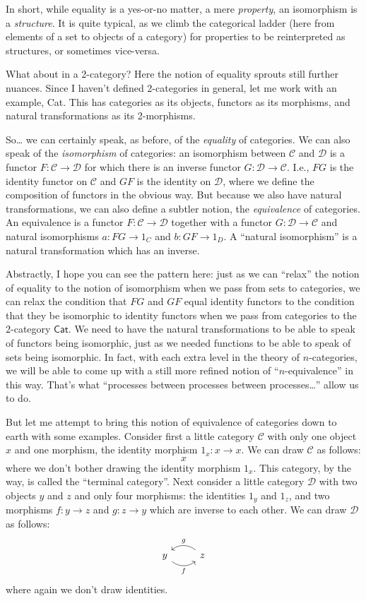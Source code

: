 \documentclass{article}
\begin{document}
In short, while equality is a yes-or-no matter, a mere \emph{property},
an isomorphism is a \emph{structure}. It is quite typical, as we climb
the categorical ladder (here from elements of a set to objects of a
category) for properties to be reinterpreted as structures, or sometimes
vice-versa.

What about in a 2-category? Here the notion of equality sprouts still
further nuances. Since I haven't defined 2-categories in general, let me
work with an example, Cat. This has categories as its objects, functors
as its morphisms, and natural transformations as its 2-morphisms.

So\ldots{} we can certainly speak, as before, of the \emph{equality} of
categories. We can also speak of the \emph{isomorphism} of categories:
an isomorphism between \(\mathcal{C}\) and \(\mathcal{D}\) is a functor
\(F\colon\mathcal{C}\to\mathcal{D}\) for which there is an inverse
functor \(G\colon\mathcal{D}\to\mathcal{C}\). I.e., \(FG\) is the
identity functor on \(\mathcal{C}\) and \(GF\) is the identity on
\(\mathcal{D}\), where we define the composition of functors in the
obvious way. But because we also have natural transformations, we can
also define a subtler notion, the \emph{equivalence} of categories. An
equivalence is a functor \(F\colon\mathcal{C}\to\mathcal{D}\) together
with a functor \(G\colon\mathcal{D}\to\mathcal{C}\) and natural
isomorphisms \(a\colon FG\to 1_C\) and \(b\colon GF \to 1_D\). A
``natural isomorphism'' is a natural transformation which has an
inverse.

Abstractly, I hope you can see the pattern here: just as we can
``relax'' the notion of equality to the notion of isomorphism when we
pass from sets to categories, we can relax the condition that \(FG\) and
\(GF\) equal identity functors to the condition that they be isomorphic
to identity functors when we pass from categories to the 2-category
\(\mathsf{Cat}\). We need to have the natural transformations to be able
to speak of functors being isomorphic, just as we needed functions to be
able to speak of sets being isomorphic. In fact, with each extra level
in the theory of \(n\)-categories, we will be able to come up with a
still more refined notion of ``\(n\)-equivalence'' in this way. That's
what ``processes between processes between processes\ldots{}'' allow us
to do.

But let me attempt to bring this notion of equivalence of categories
down to earth with some examples. Consider first a little category
\(\mathcal{C}\) with only one object \(x\) and one morphism, the
identity morphism \(1_x\colon x\to x\). We can draw \(\mathcal{C}\) as
follows: \[x\] where we don't bother drawing the identity morphism
\(1_x\). This category, by the way, is called the ``terminal category''.
Next consider a little category \(\mathcal{D}\) with two objects \(y\)
and \(z\) and only four morphisms: the identities \(1_y\) and \(1_z\),
and two morphisms \(f\colon y\to z\) and \(g\colon z\to y\) which are
inverse to each other. We can draw \(\mathcal{D}\) as follows: \[
  \begin{tikzcd}
    y \rar[bend right=40,swap,"f"] & z \lar[bend right=40,swap,"g"]
  \end{tikzcd}
\] where again we don't draw identities.
\end{document}
